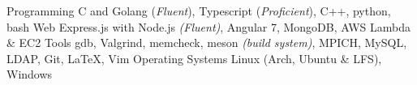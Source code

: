 \begin{cvskills}
	\cvskill
		{Programming}
        {C and Golang (\textit{Fluent}), Typescript (\textit{Proficient}), C++, python, bash}
	\cvskill
		{Web}
		{Express.js with Node.js \textit{(Fluent)}, Angular 7, MongoDB, AWS Lambda \& EC2}
	\cvskill
	{Tools}
        {gdb, Valgrind, memcheck, meson \textit{(build system)}, MPICH, MySQL, LDAP, Git, \LaTeX, Vim}
	\cvskill
		{Operating Systems}
		{Linux (Arch, Ubuntu \& LFS), Windows}
\end{cvskills}


